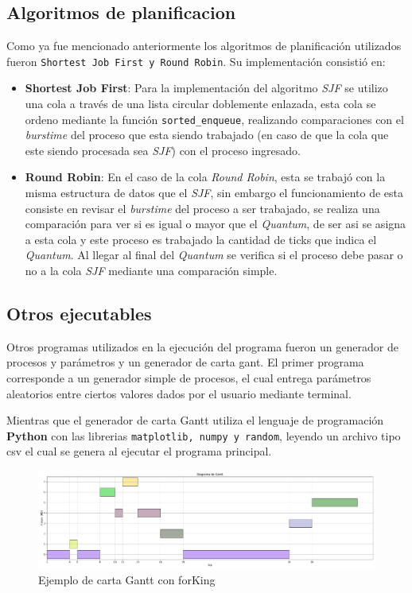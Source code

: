\subsection{Algoritmos de planificacion}
Como ya fue mencionado anteriormente los algoritmos de planificación utilizados fueron \texttt{Shortest Job First y Round Robin}. Su implementación consistió en:

\begin{itemize}
    \item \textbf{Shortest Job First}: Para la implementación del algoritmo \textit{SJF} se utilizo una cola a través de una lista circular doblemente enlazada, esta cola se ordeno mediante la función \texttt{sorted\_enqueue}, realizando comparaciones con el \textit{burstime} del proceso que esta siendo trabajado (en caso de que la cola que este siendo procesada sea \textit{SJF}) con el proceso ingresado.

    \item \textbf{Round Robin}: En el caso de la cola \textit{Round Robin}, esta se trabajó con la misma estructura de datos que el \textit{SJF}, sin embargo el funcionamiento de esta consiste en revisar el \textit{burstime} del proceso a ser trabajado, se realiza una comparación para ver si es igual o mayor que el \textit{Quantum}, de ser asi se asigna a esta cola y este proceso es trabajado la cantidad de ticks que indica el \textit{Quantum}. Al llegar al final del \textit{Quantum} se verifica si el proceso debe pasar o no a la cola \textit{SJF} mediante una comparación simple.
\end{itemize}

\subsection{Otros ejecutables}

Otros programas utilizados en la ejecución del programa fueron un generador de procesos y parámetros y un generador de carta gant. El primer programa corresponde a un generador simple de procesos, el cual entrega parámetros aleatorios entre ciertos valores dados por el usuario mediante terminal.




Mientras que el generador de carta Gantt utiliza el lenguaje de programación \textbf{Python} con las librerias \texttt{matplotlib, numpy y random}, leyendo un archivo tipo csv el cual se genera al ejecutar el programa principal.

\begin{figure}[!ht]
    \centering
    \includegraphics[width=\textwidth]{src/figures/carta_gant.pdf}
    \caption{Ejemplo de carta Gantt con forKing}\label{fig:gantt}
\end{figure}